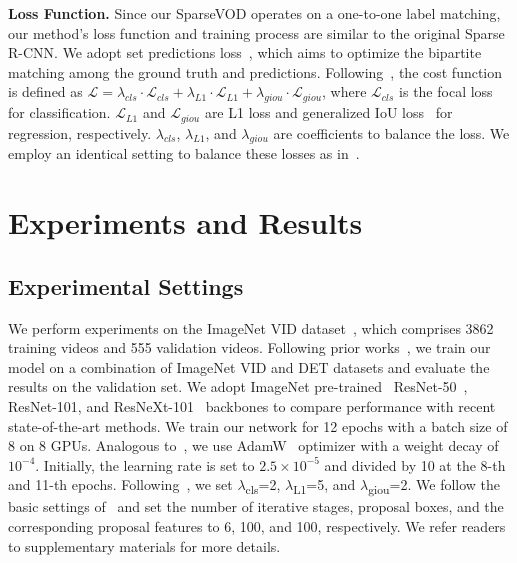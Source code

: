 \documentclass{bmvc2k}
\begin{document}
\vspace{3pt}
\noindent \textbf{Loss Function.}
\label{subsec:loss_function}
Since our SparseVOD operates on a one-to-one label matching, our method's loss function and training process are similar to the original Sparse R-CNN. We adopt set predictions loss~\cite{carion2020end, zhu2020deformable, he2021end}, which aims to optimize the bipartite matching among the ground truth and predictions. Following~\cite{he2021end, sun2021sparse, carion2020end}, the cost function is defined as $\mathcal{L} = \lambda_{cls} \cdot \mathcal{L}_{cls}+ \lambda_{L1} \cdot \mathcal{L}_{L1} + \lambda_{giou} \cdot \mathcal{L}_{giou}$, where $\mathcal{L}_{cls}$ is the focal loss~\cite{lin2017focal} for classification. $\mathcal{L}_{L1}$ and $\mathcal{L}_{giou}$ are L1 loss and  generalized IoU loss~\cite{rezatofighi2019generalized} for regression, respectively. $\lambda_{cls}$, $\lambda_{L1}$, and $\lambda_{giou}$ are coefficients to balance the loss. We employ an identical setting to balance these losses as in~\cite{sun2021sparse}.
\vspace{-15pt}

\section{Experiments and Results}
\label{sec:experiments}
\vspace{-5pt}
\subsection{Experimental Settings}
\label{subsec:experimental setup}
We perform experiments on the ImageNet VID dataset~\cite{russakovsky2015imagenet}, which comprises 3862 training videos and 555 validation videos. Following prior works~\cite{cui2021tf, wu2019sequence, zhu2017flow}, we train our model on a combination of ImageNet VID and DET datasets and evaluate the results on the validation set. We adopt ImageNet pre-trained~\cite{deng2009imagenet} ResNet-50~\cite{he2016deep}, ResNet-101, and ResNeXt-101~\cite{xie2017aggregated} backbones to compare performance with recent state-of-the-art methods. We train our network for 12 epochs with a batch size of 8 on 8 GPUs. Analogous to~\cite{sun2021sparse}, we use AdamW~\cite{loshchilov2017decoupled} optimizer with a weight decay of $10^{-4}$.  Initially, the learning rate is set to $2.5\times10^{-5}$ and divided by 10 at the 8-th and 11-th epochs. Following~\cite{sun2021sparse, carion2020end, zhu2020deformable}, we set $\lambda$\textsubscript{cls}=2, $\lambda$\textsubscript{L1}=5, and $\lambda$\textsubscript{giou}=2. We follow the basic settings of~\cite{sun2021sparse} and set the number of iterative stages, proposal boxes, and the corresponding proposal features to 6, 100, and 100, respectively. We refer readers to supplementary materials for more details. 
\end{document}
